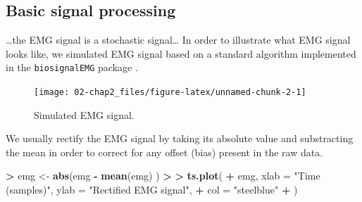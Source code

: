 \documentclass[a4paper,11pt,oneside,oldfontcommands]{memoir}
\newenvironment{Shaded}{\begin{snugshade}}{\end{snugshade}}
\newcommand{\KeywordTok}[1]{\textcolor[rgb]{0.13,0.29,0.53}{\textbf{#1}}}
\newcommand{\DataTypeTok}[1]{\textcolor[rgb]{0.13,0.29,0.53}{#1}}
\newcommand{\DecValTok}[1]{\textcolor[rgb]{0.00,0.00,0.81}{#1}}
\newcommand{\FloatTok}[1]{\textcolor[rgb]{0.00,0.00,0.81}{#1}}
\newcommand{\StringTok}[1]{\textcolor[rgb]{0.31,0.60,0.02}{#1}}
\newcommand{\OperatorTok}[1]{\textcolor[rgb]{0.81,0.36,0.00}{\textbf{#1}}}
\newcommand{\ErrorTok}[1]{\textcolor[rgb]{0.64,0.00,0.00}{\textbf{#1}}}
\newcommand{\NormalTok}[1]{#1}
\begin{document}
\subsection{Basic signal processing}\label{basic-signal-processing}

\ldots{}the EMG signal is a stochastic signal\ldots{} In order to
illustrate what EMG signal looks like, we simulated EMG signal based on
a standard algorithm implemented in the \texttt{biosignalEMG} package
\citep{R-biosignalEMG}.

\begin{Shaded}
\end{Shaded}

\begin{figure}[H]

{\centering \texttt{[image: 02-chap2\_files/figure-latex/unnamed-chunk-2-1]} 

}

\caption{Simulated EMG signal.}\label{fig:unnamed-chunk-2}
\end{figure}

We usually rectify the EMG signal by taking its absolute value and
substracting the mean in order to correct for any offset (bias) present
in the raw data.

\begin{Shaded}
\begin{Highlighting}[]
\OperatorTok{>}\StringTok{ }\NormalTok{emg <-}\StringTok{ }\KeywordTok{abs}\NormalTok{(emg }\OperatorTok{-}\StringTok{ }\KeywordTok{mean}\NormalTok{(emg) )}
\OperatorTok{>}\StringTok{ }
\ErrorTok{>}\StringTok{ }\KeywordTok{ts.plot}\NormalTok{(}
\OperatorTok{+}\StringTok{   }\NormalTok{emg, }\DataTypeTok{xlab =} \StringTok{"Time (samples)"}\NormalTok{, }\DataTypeTok{ylab =} \StringTok{"Rectified EMG signal"}\NormalTok{,}
\OperatorTok{+}\StringTok{   }\DataTypeTok{col =} \StringTok{"steelblue"}
\OperatorTok{+}\StringTok{   }\NormalTok{)}
\end{Highlighting}
\end{Shaded}
\end{document}
